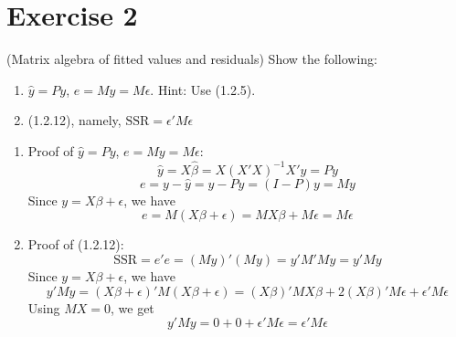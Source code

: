 \documentclass[12pt, letterpaper, onecolumn]{exam}
\begin{document}
\section*{Exercise 2}
 (Matrix algebra of fitted values and residuals) Show the following:
\begin{enumerate}
    \item $\hat{y}= Py$, $e = My = M\epsilon$. Hint: Use (1.2.5).

    \item (1.2.12), namely, $\text{SSR}= \epsilon'M\epsilon$
\end{enumerate}
\begin{solution}
    \begin{enumerate}
        \item Proof of $\hat{y}= Py$, $e = My = M\epsilon$:
              \[
                  \hat{y}= X\hat{\beta}= X(X'X)^{-1}X'y = Py
              \]
              \[
                  e = y - \hat{y}= y - Py = (I - P)y = My
              \]
              Since $y = X\beta + \epsilon$, we have
              \[
                  e = M(X\beta + \epsilon) = MX\beta + M\epsilon = M\epsilon
              \]

        \item Proof of (1.2.12):
              \[
                  \text{SSR}= e'e = (My)'(My) = y'M'My = y'My
              \]
              Since $y = X\beta + \epsilon$, we have
              \[
                  y'My = (X\beta + \epsilon)'M(X\beta + \epsilon) = (X\beta)'MX
                  \beta + 2(X\beta)'M\epsilon + \epsilon'M\epsilon
              \]
              Using $MX=0$, we get
              \[
                  y'My = 0 + 0 + \epsilon'M\epsilon = \epsilon'M\epsilon
              \]
    \end{enumerate}
\end{solution}
\end{document}
